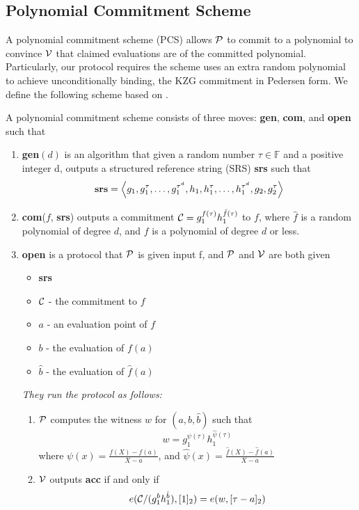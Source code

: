 \subsection{Polynomial Commitment Scheme}
A polynomial commitment scheme (PCS) allows $\mathcal{P}$ to commit to a polynomial to convince $\mathcal{V}$ that claimed evaluations are of the committed polynomial. Particularly, our protocol requires the scheme uses an extra random polynomial to achieve unconditionally binding, \ie the KZG commitment in Pedersen form. We define the following scheme based on \cite{kzg,plonk,bdfg}.
\begin{definition}
\label{def:pcs}
A polynomial commitment scheme consists of three moves: \textbf{gen}, \textbf{com}, and \textbf{open} such that
\begin{enumerate}
    \item \textbf{gen}$(d)$ is an algorithm that given a random number $\tau\in\mathbb{F}$ and a positive integer d, outputs a structured reference string (SRS) \textbf{srs} such that
    \[ \textbf{srs}=\left \langle g_1,g_1^\tau,\dots,g_1^{\tau^d},h_1,h_1^\tau,\dots,h_1^{\tau^d},g_2,g_2^\tau \right \rangle \]
    \item \textbf{com}($f$, \textbf{srs}) outputs a commitment $\mathcal{C}=g_1^{f(\tau)}h_1^{\hat{f}(\tau)}$ to $f$, where $\hat{f}$ is a random polynomial of degree $d$, and $f$ is a polynomial of degree $d$ or less.
    \item \textbf{open} is a protocol that $\mathcal{P}$ is given input f, and $\mathcal{P}$ and $\mathcal{V}$ are both given
    \begin{itemize}
        \item \textbf{srs}
        \item $\mathcal{C}$ - the commitment to $f$
        \item $a$ - an evaluation point of $f$
        \item $b$ - the evaluation of $f(a)$
        \item $\hat{b}$ - the evaluation of $\hat{f}(a)$
    \end{itemize}
    \textit{They run the protocol as follows:}
    \begin{enumerate}
        \item $\mathcal{P}$ computes the witness $w$ for $(a,b,\hat{b})$ such that
        \[ w=g_1^{\psi(\tau)}h_1^{\hat\psi(\tau)} \]
        where $\psi(x)=\frac{f(X)-f(a)}{X-a}$, and $\hat\psi(x)=\frac{\hat{f}(X)-\hat{f}(a)}{X-a}$
        \item $\mathcal{V}$ outputs \textbf{acc} if and only if
        \[ e(\mathcal{C}/(g_1^bh_1^{\hat{b}}),[1]_2)=e(w,[\tau-a]_2) \]

\end{enumerate}
\end{enumerate}
\end{definition}
